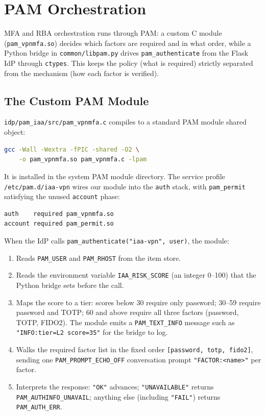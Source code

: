 \section{PAM Orchestration}
\label{sec:pam}

MFA and RBA orchestration runs through PAM: a custom C module
(\texttt{pam\_vpnmfa.so}) decides which factors are required and in what
order, while a Python bridge in \texttt{common/libpam.py} drives
\texttt{pam\_authenticate} from the Flask IdP through \texttt{ctypes}.
This keeps the policy (what is required) strictly separated from the
mechanism (how each factor is verified).

\subsection{The Custom PAM Module}
\label{sec:pam-module}
\texttt{idp/pam\_iaa/src/pam\_vpnmfa.c} compiles to a standard PAM module
shared object:

\begin{lstlisting}[language=bash, basicstyle=\ttfamily\scriptsize]
gcc -Wall -Wextra -fPIC -shared -O2 \
    -o pam_vpnmfa.so pam_vpnmfa.c -lpam
\end{lstlisting}

It is installed in the system PAM module directory.
The service profile \texttt{/etc/pam.d/iaa-vpn} wires our module into the
\texttt{auth} stack, with \texttt{pam\_permit} satisfying the unused
\texttt{account} phase:

\begin{lstlisting}[language=bash, basicstyle=\ttfamily\scriptsize]
auth    required pam_vpnmfa.so
account required pam_permit.so
\end{lstlisting}

When the IdP calls \texttt{pam\_authenticate("iaa-vpn",~user)}, the module:

\begin{enumerate}
  \item Reads \texttt{PAM\_USER} and \texttt{PAM\_RHOST} from the item store.
  \item Reads the environment variable \texttt{IAA\_RISK\_SCORE} (an
    integer 0--100) that the Python bridge sets before the call.
  \item Maps the score to a tier: scores below 30 require only password;
    30--59 require password and TOTP; 60 and above require all three
    factors (password, TOTP, FIDO2).
    The module emits a \texttt{PAM\_TEXT\_INFO} message such as
    \texttt{"INFO:tier=L2 score=35"} for the bridge to log.
  \item Walks the required factor list in the fixed order
    \texttt{[password, totp, fido2]}, sending one
    \texttt{PAM\_PROMPT\_ECHO\_OFF} conversation prompt
    \texttt{"FACTOR:<name>"} per factor.
  \item Interprets the response: \texttt{"OK"} advances;
    \texttt{"UNAVAILABLE"} returns \texttt{PAM\_AUTHINFO\_UNAVAIL};
    anything else (including \texttt{"FAIL"}) returns
    \texttt{PAM\_AUTH\_ERR}.
\end{enumerate}

